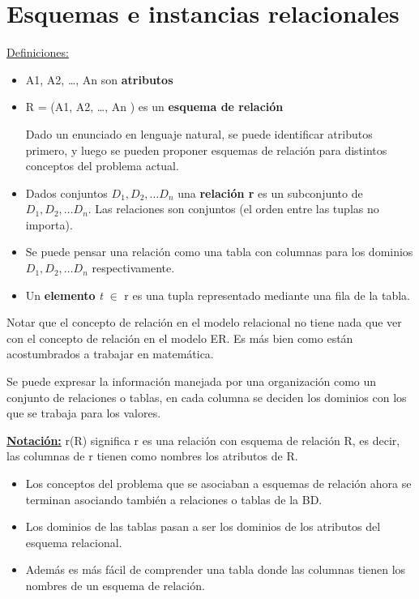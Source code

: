 \documentclass[12pt,a4paper]{report}
\begin{document}
	\section{Esquemas e instancias relacionales}
		\underline{Definiciones:}
		\begin{itemize}
			\item A1, A2, …, An son \textbf{atributos}
		 	\item R = (A1, A2, …, An ) es un \textbf{esquema de relación}
		 
		 	\par Dado un enunciado en lenguaje natural, se puede identificar atributos primero, y luego se pueden proponer esquemas de relación para distintos conceptos del problema actual.
			\item Dados conjuntos $D_{1}, D_{2}, \dotsc D_{n}$ una \textbf{relación r} es un subconjunto de $D_{1}, D_{2}, \dotsc D_{n}$. Las relaciones son conjuntos (el orden entre las tuplas no importa).
			\item Se puede pensar una relación como una tabla con columnas para los dominios $D_{1}, D_{2}, \dotsc D_{n}$ respectivamente.
			\item Un \textbf{elemento} \textit{t} $\in$ r es una tupla representado mediante una fila de la tabla.
		\end{itemize}
			\par Notar que el concepto de relación en el modelo relacional no tiene nada que ver con el concepto de relación en el modelo ER. Es más bien como están acostumbrados a trabajar en matemática.
			\par Se puede expresar la información manejada por una organización como un conjunto de relaciones o tablas, en cada columna se deciden los dominios con los que se trabaja para los valores.
			
			\vspace{5mm}
			\par \underline{\textbf{Notación:}} r(R) significa r es una relación con esquema de relación R, es decir, las columnas de r tienen como nombres los atributos de R.
			\begin{itemize}
				\item Los conceptos del problema que se asociaban a esquemas de relación ahora se terminan asociando también a relaciones o tablas de la BD.
				\item Los dominios de las tablas pasan a ser los dominios de los atributos del esquema relacional.
				\item Además es más fácil de comprender una tabla donde las columnas tienen los nombres de un esquema de relación.
			\end{itemize}
\end{document}
